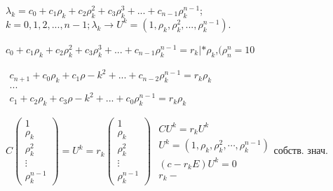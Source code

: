 \documentclass[oneside, final, 12pt]{article}
\begin{document}
\(
\lambda_k = c_0 + c_1\rho_k + c_2\rho_k^2 + c_3\rho_k^3 + ... +c_{n-1}\rho_k^{n-1}
\);\hspace{0.1cm}\(k = 0,1,2,...,n-1; 
\lambda_k \longrightarrow U^k = (1,\rho_k,\rho_k^2,...,\rho_k^{n-1}).\)
\newpage
\begin{center}
\(
 c_0 + c_1\rho_k + c_2\rho_k^2 + c_3\rho_k^3 + ... +c_{n-1}\rho_k^{n-1} = r_k  | *\rho_k
 \),\hspace{0.1cm}\((\rho_n^n = 10\)

\vspace{0.5cm}
\(
\begin{matrix}
	c_{n+1}+ c_0\rho_k + c_1\rho-k^2 + ... + c_{n-2}\rho_k^{n-1} = r_k\rho_k\\
	...\\
	c_1+ c_2\rho_k + c_3\rho-k^2 + ... + c_0\rho_k^{n-1} = r_k\rho_k
\end{matrix}
 \)

\end{center}
\vspace{0.5cm}
\(
C
	\begin{pmatrix}
		1\\ \rho_k \\ \rho_k^2 \\ \vdots \\ \rho_k^{n-1}
	\end{pmatrix}
	=U^k = 
	r_k
	\begin{pmatrix}
		1\\ \rho_k \\ \rho_k^2 \\ \vdots \\ \rho_k^{n-1}
	\end{pmatrix}
\)\hspace{1cm}
\(
	\begin{matrix}
		CU^k = r_kU^k \\
		U^k = (1, \rho_k, \rho_k^2, \cdots, \rho_k^{n-1}) \\
		(c - r_kE)U^k = 0\\ 
		r_k - 
	\end{matrix}
\)собств. знач.
\end{document}
